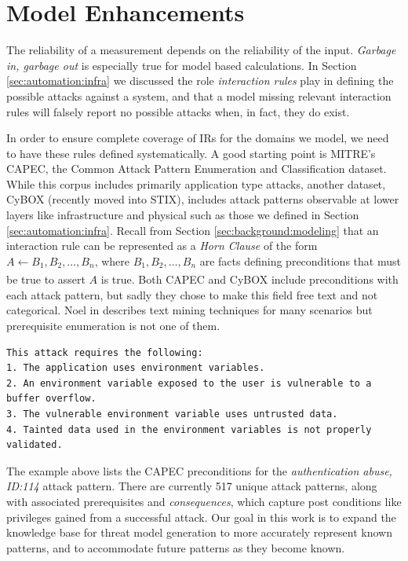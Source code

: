 \section{Model Enhancements}

The reliability of a measurement depends on the reliability of the input. \textit{Garbage in, garbage out} is especially true for model based calculations. In Section \ref{sec:automation:infra} we discussed the role \textit{interaction rules} play in defining the possible attacks against a system, and that a model missing relevant interaction rules will falsely report no possible attacks when, in fact, they do exist. 

In order to ensure complete coverage of IRs for the domains we model, we need to have these rules defined systematically. A good starting point is MITRE's CAPEC\cite{Corporation}, the Common Attack Pattern Enumeration and Classification dataset. While this corpus includes primarily application type attacks, another dataset, CyBOX (recently moved into STIX), includes attack patterns observable at lower layers like infrastructure and physical such as those we defined in Section \ref{sec:automation:infra}.  
Recall from Section \ref{sec:background:modeling} that an interaction rule can be represented as a \textit{Horn Clause} of the form $A\xleftarrow[]{} B_1, B_2,\dots, B_n $, where $B_1, B_2,\dots, B_n $ are facts defining preconditions that must be true to assert $A$ is true. Both CAPEC and CyBOX include preconditions with each attack pattern, but sadly they chose to make this field free text and not categorical. Noel in \cite{Noel_2018} describes text mining techniques for many scenarios but prerequisite enumeration is not one of them. 

\begin{verbatim}
This attack requires the following:
1. The application uses environment variables.
2. An environment variable exposed to the user is vulnerable to a buffer overflow.
3. The vulnerable environment variable uses untrusted data.
4. Tainted data used in the environment variables is not properly validated. 
\end{verbatim}

The example above lists the CAPEC preconditions for the \textit{authentication abuse, ID:114} attack pattern. There are currently 517 unique attack patterns, along with associated prerequisites and \textit{consequences}, which capture post conditions like privileges gained from a successful attack. Our goal in this work is to expand the knowledge base for threat model generation to more accurately represent known patterns, and to accommodate future patterns as they become known.

